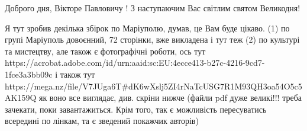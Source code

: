 Доброго дня, Вікторе Павловичу ! З наступаючим Вас світлим святом Великодня!

Я тут зробив декілька збірок по Маріуполю, думав, це Вам буде цікаво. (1) по
групі Маріуполь довоєнний, 72 сторінки, вже викладена і тут теж (2) по культурі
та мистецтву, але також є фотографічні роботи, ось тут
https://acrobat.adobe.com/id/urn:aaid:sc:EU:4ecce413-b27c-4216-9cd7-1fce3a3bb09c
і також тут
https://mega.nz/file/V7JUga6T#dK6wXslj5ZI4rNaTcUSG7R1M93QH3oa54O5c5AK159Q як
воно все виглядає, див. скріни нижче (файли pdf дуже великі!!! треба зачекати,
поки завантажиться. Крім того, так є можливість пересуватись всередині по
лінкам, та є зведений покажчик авторів)
